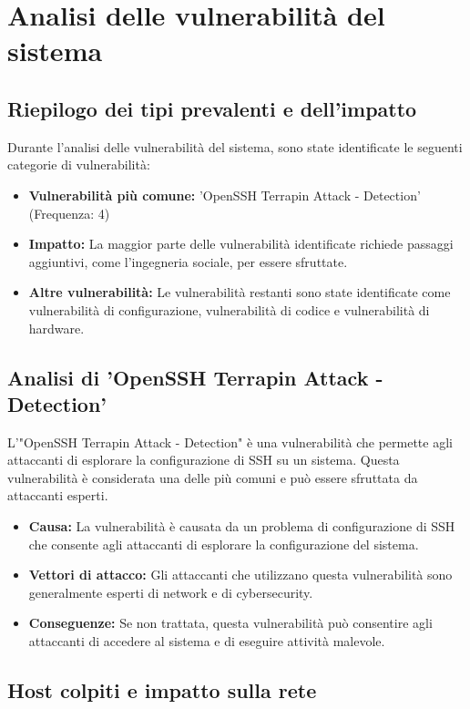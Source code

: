 \chapter{Analisi delle vulnerabilità del sistema}

\section{Riepilogo dei tipi prevalenti e dell'impatto}

Durante l'analisi delle vulnerabilità del sistema, sono state identificate le seguenti categorie di vulnerabilità:
\begin{itemize}
\item \textbf{Vulnerabilità più comune:} 'OpenSSH Terrapin Attack - Detection' (Frequenza: 4)
\item \textbf{Impatto:} La maggior parte delle vulnerabilità identificate richiede passaggi aggiuntivi, come l'ingegneria sociale, per essere sfruttate.
\item \textbf{Altre vulnerabilità:} Le vulnerabilità restanti sono state identificate come vulnerabilità di configurazione, vulnerabilità di codice e vulnerabilità di hardware.
\end{itemize}
\section{Analisi di 'OpenSSH Terrapin Attack - Detection'}

L'"OpenSSH Terrapin Attack - Detection" è una vulnerabilità che permette agli attaccanti di esplorare la configurazione di SSH su un sistema. Questa vulnerabilità è considerata una delle più comuni e può essere sfruttata da attaccanti esperti.
\begin{itemize}
\item \textbf{Causa:} La vulnerabilità è causata da un problema di configurazione di SSH che consente agli attaccanti di esplorare la configurazione del sistema.
\item \textbf{Vettori di attacco:} Gli attaccanti che utilizzano questa vulnerabilità sono generalmente esperti di network e di cybersecurity.
\item \textbf{Conseguenze:} Se non trattata, questa vulnerabilità può consentire agli attaccanti di accedere al sistema e di eseguire attività malevole.
\end{itemize}
\section{Host colpiti e impatto sulla rete}

